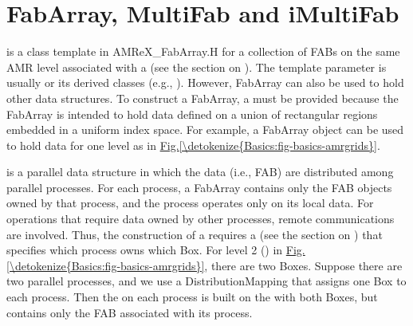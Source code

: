 \documentclass[letterpaper,10pt,english]{sphinxmanual}
\begin{document}
\section{FabArray, MultiFab and iMultiFab}
\label{\detokenize{Basics:fabarray-multifab-and-imultifab}}\label{\detokenize{Basics:sec-basics-multifab}}
\sphinxAtStartPar
{} is a class template in AMReX\_FabArray.H for a collection
of FABs on the same AMR level associated with a  (see the
section on {\hyperref[\detokenize{Basics:sec-basics-ba}]{}}). The template parameter  is usually
 or its derived classes (e.g., ). However, FabArray
can also be used to hold other data structures. To construct a FabArray, a
 must be provided because the FabArray is intended to hold  data
defined on a union of rectangular regions embedded in a uniform index space.
For example, a FabArray object can be used to hold data for one level as in
\hyperref[\detokenize{Basics:fig-basics-amrgrids}]{Fig.\@ \ref{\detokenize{Basics:fig-basics-amrgrids}}}.

\sphinxAtStartPar
{} is a parallel data structure in which the data (i.e., FAB) are
distributed among parallel processes. For each process, a FabArray contains
only the FAB objects owned by that process, and the process operates only on
its local data. For operations that require data owned by other processes,
remote communications are involved. Thus, the construction of a 
requires a  (see the section on {\hyperref[\detokenize{Basics:sec-basics-dm}]{}})
that specifies which process owns which Box. For level 2 () in
\hyperref[\detokenize{Basics:fig-basics-amrgrids}]{Fig.\@ \ref{\detokenize{Basics:fig-basics-amrgrids}}}, there are two Boxes. Suppose there are two
parallel processes, and we use a DistributionMapping that assigns one Box to
each process. Then the  on each process is built on the
 with both Boxes, but contains only the FAB associated with its process.
\end{document}
